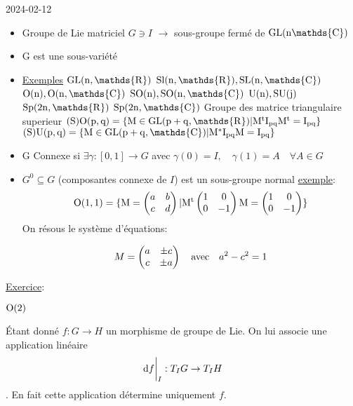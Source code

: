 


2024-02-12

\begin{tcolorbox}[title=Rappels]

	\begin{itemize}
		\item Groupe de Lie matriciel \(G \ni I\)
			\(\to\) sous-groupe fermé de \(\rm{GL}(n \mathds{C})\)
		\item G est une sous-variété 
		\item \underline{Exemples}
			\(\rm{GL}(n, \mathds{R})\)
			\(\rm{Sl}(n,\mathds{R}), \rm{SL}(n,\mathds{C})\)
			\(\rm{O}(n), \rm{O}(n,\mathds{C})\)
			\(\rm{SO}(n), \rm{SO}(n, \mathds{C})\)
			\(\rm{U}(n), \rm{SU}(j)\)
			\(\rm{Sp}(2n, \mathds{R})\)
			\(\rm{Sp}(2n, \mathds{C})\)
			Groupe des matrice triangulaire superieur
			\((\rm{S})\rm{O}(p,q) = \{ M \in \rm{GL}(p+q, \mathds{R}) | M^{t}I_{pq} M^{t}= I_{pq}  \} \)
			\((\rm{S})\rm{U}(p,q) = \{ M \in \rm{GL}(p+q, \mathds{C}) | M^{*} I_{pq} M = I_{pq}  \} \)

		\item \rm{G} Connexe si \(\exists \gamma: [0,1] \to G\)
			avec \(\gamma(0) = I, \quad \gamma(1) = A \quad \forall A \in G\)
		\item \(G^{0} \subseteq G\) (composantes connexe de \(I\)) est un sous-groupe normal 
	\underline{exemple}: 
	\[\rm{O}(1,1) = \{ M= \begin{pmatrix} a &b \\ c & d \end{pmatrix}  | M^{t} \begin{pmatrix} 1 & 0 \\ 0 & -1 \end{pmatrix} M = \begin{pmatrix} 1 & 0 \\ 0 & -1 \end{pmatrix} \} \]
	On résous le système d'équations:

	\[ M = \begin{pmatrix} a & \pm c\\ c & \pm a \end{pmatrix} \qq{avec} a^{2}- c^{2} =1  \]
	\end{itemize}
	 
	\underline{Exercice}:

	\(\rm{O}(2)\)

\end{tcolorbox}

Étant donné \(f:G \to H\) un morphisme de groupe de Lie. On lui associe une application linéaire \[ \eval{\dd f}_{I} : T_I G \to T_{I} H \]. En fait cette application détermine uniquement \(f\). 

